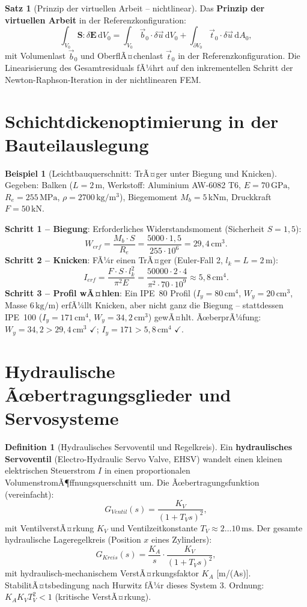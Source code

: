 ﻿\documentclass[a4paper,12pt]{report}
\theoremstyle{definition}
\newtheorem{definition}{Definition}
\newtheorem{beispiel}{Beispiel}
\newtheorem{satz}{Satz}
\begin{document}
\begin{satz}[Prinzip der virtuellen Arbeit -- nichtlinear]
Das \textbf{Prinzip der virtuellen Arbeit} in der Referenzkonfiguration:
\[
  \int_{V_0} \mathbf{S}:\delta\mathbf{E}\,\mathrm{d}V_0 = \int_{V_0}\vec{b}_0\cdot\delta\vec{u}\,\mathrm{d}V_0
  + \int_{\partial V_0}\vec{t}_0\cdot\delta\vec{u}\,\mathrm{d}A_0,
\]
mit Volumenlast $\vec{b}_0$ und OberflÃ¤chenlast $\vec{t}_0$ in der Referenzkonfiguration.
Die Linearisierung des Gesamtresiduals fÃ¼hrt auf den inkrementellen Schritt
der Newton-Raphson-Iteration in der nichtlinearen FEM.
\end{satz}

\section{Schichtdickenoptimierung in der Bauteilauslegung}

\begin{beispiel}[Leichtbauquerschnitt: TrÃ¤ger unter Biegung und Knicken]
Gegeben: Balken ($L = 2\,\mathrm{m}$, Werkstoff: Aluminium AW-6082 T6,
$E = 70\,\mathrm{GPa}$, $R_e = 255\,\mathrm{MPa}$, $\rho = 2700\,\mathrm{kg/m^3}$),
Biegemoment $M_b = 5\,\mathrm{kNm}$, Druckkraft $F = 50\,\mathrm{kN}$.

\medskip\noindent\textbf{Schritt 1 -- Biegung}: Erforderliches Widerstandsmoment
(Sicherheit $S = 1{,}5$):
\[
  W_{erf} = \frac{M_b\cdot S}{R_e} = \frac{5000\cdot1{,}5}{255\cdot10^6} = 29{,}4\,\mathrm{cm^3}.
\]
\textbf{Schritt 2 -- Knicken}: FÃ¼r einen TrÃ¤ger (Euler-Fall 2, $l_k = L = 2\,\mathrm{m}$):
\[
  I_{erf} = \frac{F\cdot S\cdot l_k^2}{\pi^2 E} = \frac{50000\cdot2\cdot4}{\pi^2\cdot70\cdot10^9}
  \approx 5{,}8\,\mathrm{cm^4}.
\]
\textbf{Schritt 3 -- Profil wÃ¤hlen}: Ein IPE~80 Profil
($I_y = 80\,\mathrm{cm^4}$, $W_y = 20\,\mathrm{cm^3}$, Masse $6\,\mathrm{kg/m}$)
erfÃ¼llt Knicken, aber nicht ganz die Biegung -- stattdessen IPE~100
($I_y = 171\,\mathrm{cm^4}$, $W_y = 34{,}2\,\mathrm{cm^3}$) gewÃ¤hlt.
ÃœberprÃ¼fung: $W_y = 34{,}2 > 29{,}4\,\mathrm{cm^3}$ $\checkmark$; $I_y = 171 > 5{,}8\,\mathrm{cm^4}$ $\checkmark$.
\end{beispiel}

\section{Hydraulische Ãœbertragungsglieder und Servosysteme}

\begin{definition}[Hydraulisches Servoventil und Regelkreis]
Ein \textbf{hydraulisches Servoventil} (Electro-Hydraulic Servo Valve, EHSV)
wandelt einen kleinen elektrischen Steuerstrom $I$ in einen proportionalen
VolumenstromÃ¶ffnungsquerschnitt um. Die Ãœbertragungsfunktion (vereinfacht):
\[
  G_{Ventil}(s) = \frac{K_V}{(1 + T_V s)^2},
\]
mit VentilverstÃ¤rkung $K_V$ und Ventilzeitkonstante $T_V \approx 2\ldots10\,\mathrm{ms}$.
Der gesamte hydraulische Lageregelkreis (Position $x$ eines Zylinders):
\[
  G_{Kreis}(s) = \frac{K_A}{s}\cdot\frac{K_V}{(1+T_V s)^2},
\]
mit hydraulisch-mechanischem VerstÃ¤rkungsfaktor $K_A$ [m/(As)].
StabilitÃ¤tsbedingung nach Hurwitz fÃ¼r dieses System 3. Ordnung:
$K_A K_V T_V^2 < 1$ (kritische VerstÃ¤rkung).
\end{definition}
\end{document}
